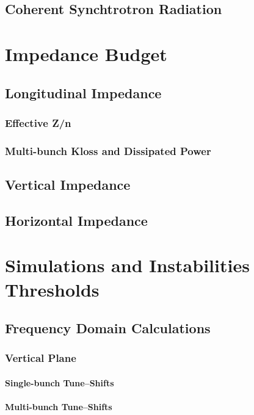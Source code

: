 \section{Coherent Synchtrotron Radiation}

\chapter{Impedance Budget}
\section{Longitudinal Impedance}
\subsection{Effective Z/n}
\subsection{Multi-bunch Kloss and Dissipated Power}
\section{Vertical Impedance}
\section{Horizontal Impedance}

\chapter{Simulations and Instabilities Thresholds}
\section{Frequency Domain Calculations}
\subsection{Vertical Plane}
\subsubsection{Single-bunch Tune--Shifts}
\subsubsection{Multi-bunch Tune--Shifts}
